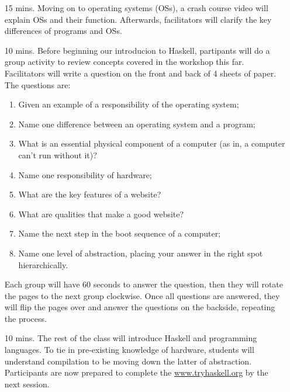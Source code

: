 \documentclass[12pt]{article}
\begin{document}
\begin{itemize}
    \item[15 mins.] Moving on to operating systems (OSs), a crash course video
      will explain OSs and their function. Afterwards, facilitators will
      clarify the key differences of programs and OSs. 
    \item[10 mins.] Before beginning our introducion to Haskell, partipants
      will do a group activity to review concepts covered in the workshop this
      far. Facilitators will write a question on the front and back of 4 sheets
      of paper. The questions are:
      \begin{enumerate}
        \item Given an example of a responsibility of the operating system;
        \item Name one difference between an operating system and a program;
        \item What is an essential physical component of a computer (as in, a
          computer can't run without it)?
        \item Name one responsibility of hardware;
        \item What are the key features of a website?
        \item What are qualities that make a good website?
        \item Name the next step in the boot sequence of a computer;
        \item Name one level of abstraction, placing your answer in the right
          spot hierarchically.
      \end{enumerate}
      Each group will have 60 seconds to answer the question, then they will
      rotate the pages to the next group clockwise. Once all questions are
      answered, they will flip the pages over and answer the questions on the
      backside, repeating the process.
    \item[10 mins.] The rest of the class will introduce Haskell and
      programming languages. To tie in pre-existing knowledge of hardware,
      students will understand compilation to be moving down the latter of
      abstraction. Participants are now prepared to complete the
      \url{www.tryhaskell.org} by the next session.
  \end{itemize}
\end{document}
